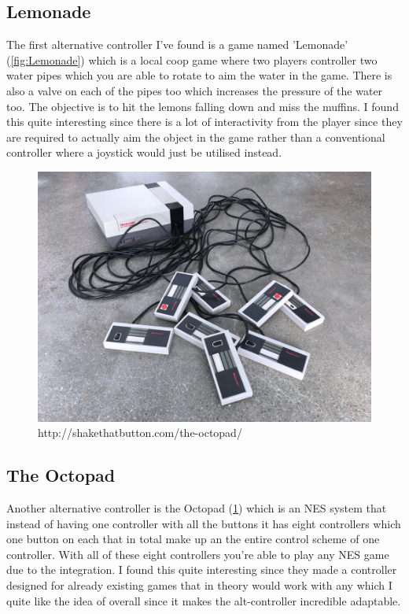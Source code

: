 \documentclass{article}
\begin{document}
\subsection{Lemonade}

The first alternative controller I've found is a game named 'Lemonade' (\ref{fig:Lemonade}) which is a local coop game where two players controller two water pipes which you are able to rotate to aim the water in the game. There is also a valve on each of the pipes too which increases the pressure of the water too. The objective is to hit the lemons falling down and miss the muffins. I found this quite interesting since there is a lot of interactivity from the player since they are required to actually aim the object in the game rather than a conventional controller where a joystick would just be utilised instead.

\begin{figure}[ht]
  \includegraphics[width=\textwidth,height=\textheight,keepaspectratio]{ocotopad.PNG}
  \caption{http://shakethatbutton.com/the-octopad/}
  \label{fig:Octopad}
\end{figure}

\subsection{The Octopad}

Another alternative controller is the Octopad (\ref{fig:Octopad}) which is an NES system that instead of having one controller with all the buttons it has eight controllers which one button on each that in total make up an the entire control scheme of one controller. With all of these eight controllers you're able to play any NES game due to the integration. I found this quite interesting since they made a controller designed for already existing games that in theory would work with any which I quite like the idea of overall since it makes the alt-controller incredible adaptable.
\end{document}
